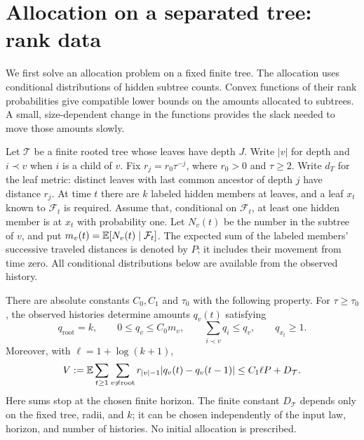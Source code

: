 \section{Allocation on a separated tree: rank data}
\label{sec:allocation}

We first solve an allocation problem on a fixed finite tree.  The allocation
uses conditional distributions of hidden subtree counts.  Convex functions
of their rank probabilities give compatible lower bounds on the amounts
allocated to subtrees.  A small, size-dependent change in the functions
provides the slack needed to move those amounts slowly.

Let $\mathcal T$ be a finite rooted tree whose leaves have depth $J$.
Write $|v|$ for depth and $i\prec v$ when $i$ is a child of $v$.
Fix $r_j=r_0\tau^{-j}$, where $r_0>0$ and $\tau\ge2$.
Write $d_T$ for the leaf metric: distinct leaves with last common
ancestor of depth $j$ have distance $r_j$.  At time $t$ there are $k$
labeled hidden members at leaves,
and a leaf $x_t$ known to $\mathcal F_t$ is required.  Assume that,
conditional on $\mathcal F_t$, at least one hidden member is at $x_t$
with probability one.  Let $N_v(t)$ be the number in the subtree of $v$,
and put $m_v(t)=\mathbb E[N_v(t)\mid\mathcal F_t]$.  The expected sum of
the labeled members' successive traveled distances is denoted by $P$;
it includes their movement from time zero.  All conditional distributions
below are available from the observed history.

\begin{theorem}\label{thm:allocation}
There are absolute constants $C_0,C_1$ and $\tau_0$ with the following
property.  For $\tau\ge\tau_0$, the observed histories determine amounts
$q_v(t)$ satisfying
\begin{equation}\label{eq:allocation-constraints}
 q_{\mathrm{root}}=k,\qquad
 0\le q_v\le C_0m_v,\qquad
 \sum_{i\prec v}q_i\le q_v,\qquad q_{x_t}\ge1.
\end{equation}
Moreover, with $\ell=1+\log(k+1)$,
\begin{equation}\label{eq:allocation-bound}
 V:=\mathbb E\sum_{t\ge1}\sum_{v\ne\mathrm{root}}
       r_{|v|-1}|q_v(t)-q_v(t-1)|
 \le C_1\ell P+D_{\mathcal T}.
\end{equation}
Here sums stop at the chosen finite horizon.  The finite constant
$D_{\mathcal T}$ depends only on the fixed tree, radii, and $k$;
it can be chosen independently of the input law, horizon, and number of
histories.  No initial allocation is prescribed.
\end{theorem}

